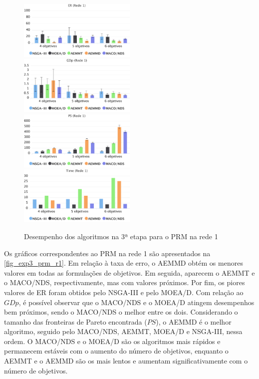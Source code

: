 \begin{figure}[!htbp]
	\includegraphics[width=0.5\textwidth]{cap_experimentos/figs/etapa3/er-mrp-r1}
	\includegraphics[width=0.5\textwidth]{cap_experimentos/figs/etapa3/gd-mrp-r1}
	\includegraphics[width=0.5\textwidth]{cap_experimentos/figs/etapa3/ps-mrp-r1}
	\includegraphics[width=0.5\textwidth]{cap_experimentos/figs/etapa3/time-mrp-r1}
	\caption{\label{fig_exp3_prm_r1}Desempenho dos algoritmos na 3ª etapa para o PRM na rede 1}
\end{figure}

Os gráficos correspondentes ao PRM na rede 1 são apresentados na \autoref{fig_exp3_prm_r1}. Em relação à taxa de erro, o AEMMD obtém os menores valores em todas as formulações de objetivos. Em seguida, aparecem o AEMMT e o MACO/NDS, respectivamente, mas com valores próximos. Por fim, os piores valores de ER foram obtidos pelo NSGA-III e pelo MOEA/D. Com relação ao $GDp$, é possível observar que o MACO/NDS e o MOEA/D atingem desempenhos bem próximos, sendo o MACO/NDS o melhor entre os dois. Considerando o tamanho das fronteiras de Pareto encontrada ($PS$), o AEMMD é o melhor algoritmo, seguido pelo MACO/NDS, AEMMT, MOEA/D e NSGA-III, nessa ordem. O MACO/NDS e o MOEA/D são os algoritmos mais rápidos e permanecem estáveis com o aumento do número de objetivos, enquanto o AEMMT e o AEMMD são os mais lentos e aumentam significativamente com o número de objetivos.

